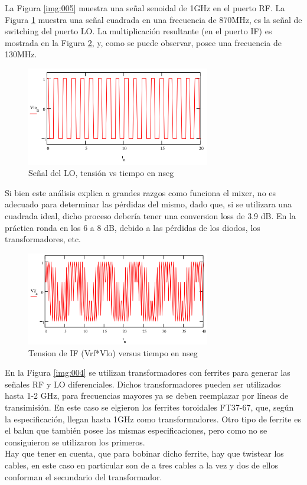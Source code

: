 \documentclass[a4paper,10pt]{article}
\begin{document}
	\indent La Figura \ref{img:005} muestra una señal senoidal de 1GHz en el
	puerto RF. La Figura \ref{img:006} muestra una señal cuadrada en una 
	frecuencia de 870MHz, es la señal de switching del puerto LO. La 
	multiplicación resultante (en el puerto IF) es mostrada en la Figura 
	\ref{img:007}, y, como se puede observar, posee una frecuencia de 130MHz. \\
	
	\begin{figure}[!htb]
		\centering
		\includegraphics[width=8cm]{Images/VLO.png}
		\caption{Señal del LO, tensión vs tiempo en nseg}
		\label{img:006}
	\end{figure}
	
	\indent Si bien este análisis explica a grandes razgos como funciona el 
	mixer, no es adecuado para determinar las pérdidas del mismo, dado que, si 
	se utilizara una cuadrada ideal, dicho proceso debería tener una conversion
	loss de 3.9 dB. En la práctica ronda en los 6 a 8 dB, debido a las pérdidas
	de los diodos, los transformadores, etc. \\
	
	\begin{figure}[!htb]
		\centering
		\includegraphics[width=8cm]{Images/VIF.png}
		\caption{Tension de IF (Vrf*Vlo) versus tiempo en nseg}
		\label{img:007}
	\end{figure}

	\indent En la Figura \ref{img:004} se utilizan transformadores con ferrites 
	para generar las señales RF y LO diferenciales. Dichos transformadores 
	pueden ser utilizados hasta 1-2 GHz, para frecuencias mayores ya se deben 
	reemplazar por líneas de transimisión. En este caso se elgieron los 
	ferrites toroidales FT37-67, que, según la especificación, llegan hasta 1GHz
	como transformadores. Otro tipo de ferrite es el balun que tambi\'en posee las
	mismas especificaciones, pero como no se consiguieron se utilizaron los 
	primeros.\\
	\indent Hay que tener en cuenta, que para bobinar dicho ferrite, hay que 
	twistear los cables, en este caso en particular son de a tres cables a la 
	vez y dos de ellos conforman el secundario del transformador.
\end{document}
